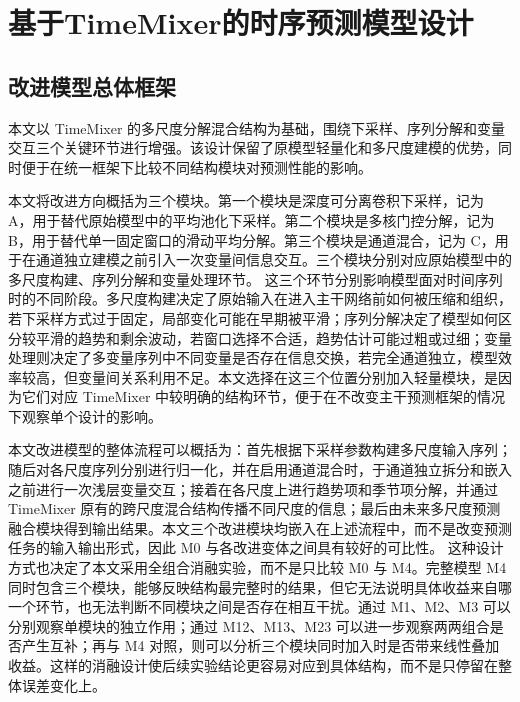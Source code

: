 
\chapter{基于TimeMixer的时序预测模型设计}

\section{改进模型总体框架}

本文以 TimeMixer 的多尺度分解混合结构为基础，围绕下采样、序列分解和变量交互三个关键环节进行增强。该设计保留了原模型轻量化和多尺度建模的优势，同时便于在统一框架下比较不同结构模块对预测性能的影响。

本文将改进方向概括为三个模块。第一个模块是深度可分离卷积下采样，记为 A，用于替代原始模型中的平均池化下采样。第二个模块是多核门控分解，记为 B，用于替代单一固定窗口的滑动平均分解。第三个模块是通道混合，记为 C，用于在通道独立建模之前引入一次变量间信息交互。三个模块分别对应原始模型中的多尺度构建、序列分解和变量处理环节。
这三个环节分别影响模型面对时间序列时的不同阶段。多尺度构建决定了原始输入在进入主干网络前如何被压缩和组织，若下采样方式过于固定，局部变化可能在早期被平滑；序列分解决定了模型如何区分较平滑的趋势和剩余波动，若窗口选择不合适，趋势估计可能过粗或过细；变量处理则决定了多变量序列中不同变量是否存在信息交换，若完全通道独立，模型效率较高，但变量间关系利用不足。本文选择在这三个位置分别加入轻量模块，是因为它们对应 TimeMixer 中较明确的结构环节，便于在不改变主干预测框架的情况下观察单个设计的影响。

本文改进模型的整体流程可以概括为：首先根据下采样参数构建多尺度输入序列；随后对各尺度序列分别进行归一化，并在启用通道混合时，于通道独立拆分和嵌入之前进行一次浅层变量交互；接着在各尺度上进行趋势项和季节项分解，并通过 TimeMixer 原有的跨尺度混合结构传播不同尺度的信息；最后由未来多尺度预测融合模块得到输出结果。本文三个改进模块均嵌入在上述流程中，而不是改变预测任务的输入输出形式，因此 M0 与各改进变体之间具有较好的可比性。
这种设计方式也决定了本文采用全组合消融实验，而不是只比较 M0 与 M4。完整模型 M4 同时包含三个模块，能够反映结构最完整时的结果，但它无法说明具体收益来自哪一个环节，也无法判断不同模块之间是否存在相互干扰。通过 M1、M2、M3 可以分别观察单模块的独立作用；通过 M12、M13、M23 可以进一步观察两两组合是否产生互补；再与 M4 对照，则可以分析三个模块同时加入时是否带来线性叠加收益。这样的消融设计使后续实验结论更容易对应到具体结构，而不是只停留在整体误差变化上。

